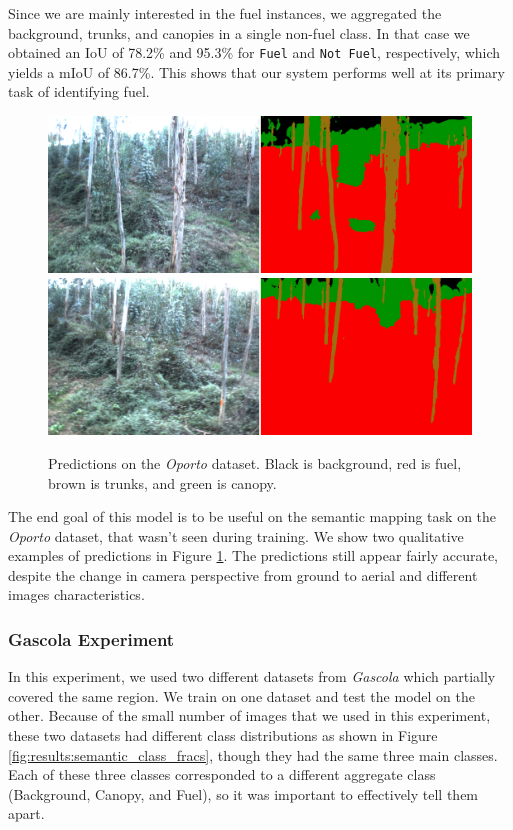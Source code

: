 Since we are mainly interested in the fuel instances, we aggregated the background, trunks, and canopies in a single non-fuel class. In that case we obtained an IoU of 78.2\% and 95.3\% for \texttt{Fuel} and \texttt{Not Fuel}, respectively, which yields a mIoU of 86.7\%. This shows that our system performs well at its primary task of identifying fuel.

\begin{figure}
   \centering
    \includegraphics[width=\linewidth]{figs/results/semantic_segmentation/SeteFontes/qualatative_001400.png}  
    \includegraphics[width=\linewidth]{figs/results/semantic_segmentation/SeteFontes/qualatative_001600.png}  
    \caption{Predictions on the \textit{Oporto} dataset. Black is background, red is fuel, brown is trunks, and green is canopy.
    } 
    \label{fig:results:oporto_semantic_seg_qual}
\end{figure}


The end goal of this model is to be useful on the semantic mapping task on the \textit{Oporto} dataset, that wasn't seen during training. We show two qualitative examples of predictions in Figure \ref{fig:results:oporto_semantic_seg_qual}. The predictions still appear fairly accurate, despite the change in camera perspective from ground to aerial and different images characteristics. 


\subsubsection{Gascola Experiment}
In this experiment, we used two different datasets from \textit{Gascola} which partially covered the same region. We train on one dataset and test the model on the other. Because of the small number of images that we used in this experiment, these two datasets had different class distributions as shown in Figure \ref{fig:results:semantic_class_fracs}, though they had the same three main classes. Each of these three classes corresponded to a different aggregate class (Background, Canopy, and Fuel), so it was important to effectively tell them apart. 


